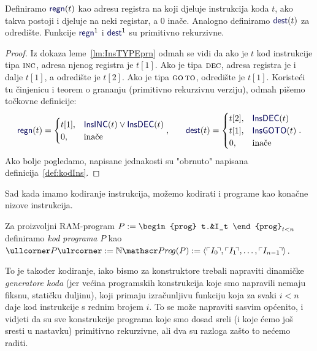 \begin{lema}[{name=[primitivna rekurzivnost komponenata instrukcije]}]\label{lm:regndestprn}
    Definiramo $\f{regn}(t)$ kao adresu registra na koji djeluje instrukcija koda $t$, ako takva postoji i djeluje na neki registar, a $0$ inače. Analogno definiramo $\f{dest}(t)$ za odredište. Funkcije $\f{regn}^1$ i $\f{dest}^1$ su primitivno rekurzivne.
\end{lema}
\begin{proof}
    Iz dokaza leme~\ref{lm:InsTYPEprn} odmah se vidi da ako je $t$ kod instrukcije tipa $\textsc{inc}$, adresa njenog registra je $t[1]$. Ako je tipa $\textsc{dec}$, adresa registra je i dalje $t[1]$, a odredište je $t[2]$. Ako je tipa $\textsc{go\,to}$, odredište je $t[1]$.
    Koristeći tu činjenicu i teorem o grananju (primitivno rekurzivnu verziju), odmah pišemo točkovne definicije:
\begin{equation}
    \f{regn}(t)=\begin{cases}
    t[1],&\f{InsINC}(t)\lor\f{InsDEC}(t)\\
    0,&\text{inače}
    \end{cases}\text,\qquad
    \f{dest}(t)=\begin{cases}
    t[2],&\f{InsDEC}(t)\\
    t[1],&\f{InsGOTO}(t)\\
    0,&\text{inače}
    \end{cases}\text.
\end{equation}
Ako bolje pogledamo, napisane jednakosti su "obrnuto" napisana definicija~\ref{def:kodIns}.
\end{proof}


Sad kada imamo kodiranje instrukcija, možemo kodirati i programe kao konačne nizove instrukcija.

\begin{definicija}[{name=[kodiranje skupa $\mathscr Prog$]}]\label{def:kodProg}
Za proizvoljni RAM-program
$P:=\begin{prog}
t.&I_t
\end{prog}_{t<n}$
definiramo \emph{kod programa} $P$ kao
	$\kprog P:=\N\mathscr Pr\mspace{-1mu}o\mspace{-2mu}g(P):=\langle\kins{I_0\!},\kins{I_1\!},\dotsc,\kins{I_{n-1}\!}\rangle$.
\end{definicija}

To je također kodiranje, iako bismo za konstruktore trebali napraviti dinamičke \emph{generatore koda} (jer većina programskih konstrukcija koje smo napravili nemaju fiksnu, statičku duljinu), koji primaju izračunljivu funkciju koja za svaki $i<n$ daje kod instrukcije s rednim brojem $i$. To se može napraviti sasvim općenito, i vidjeti da su sve konstrukcije programa koje smo dosad sreli (i koje ćemo još sresti u nastavku) primitivno rekurzivne, ali dva su razloga zašto to nećemo raditi.


